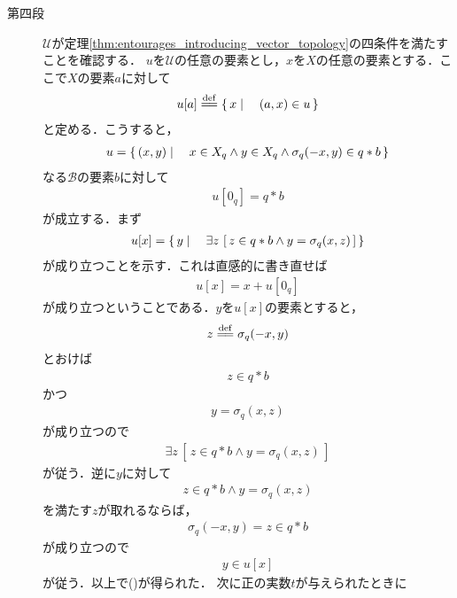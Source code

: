 \begin{sketch}
\begin{description}
			\item[第四段]
				$\mathscr{U}$が定理\ref{thm:entourages_introducing_vector_topology}の四条件を満たすことを確認する．
				$u$を$\mathscr{U}$の任意の要素とし，$x$を$X$の任意の要素とする．ここで$X$の要素$a$に対して
				\begin{align}
					u[a] \defeq \Set{x}{(a,x) \in u}
				\end{align}
				と定める．こうすると，
				\begin{align}
					u = \left\{\, (x,y) \mid \quad x \in X_q \wedge y \in X_q \wedge \sigma_q(-x,y) \in q \ast b\, \right\}
				\end{align}
				なる$\mathscr{B}$の要素$b$に対して
				\begin{align}
					u[0_q] = q \ast b
				\end{align}
				が成立する．まず
				\begin{align}
					u[x] = \left\{\, y \mid \quad \exists z\, \left[\, z \in q \ast b \wedge y = \sigma_q(x,z)\, \right]\, \right\}
					\label{fom:thm_quotient_topological_vector_space_2}
				\end{align}
				が成り立つことを示す．これは直感的に書き直せば
				\begin{align}
					u[x] = x  + u[0_q]
				\end{align}
				が成り立つということである．$y$を$u[x]$の要素とすると，
				\begin{align}
					z \defeq \sigma_q(-x,y)
				\end{align}
				とおけば
				\begin{align}
					z \in q \ast b
				\end{align}
				かつ
				\begin{align}
					y = \sigma_q(x,z)
				\end{align}
				が成り立つので
				\begin{align}
					\exists z\, \left[\, z \in q \ast b \wedge y = \sigma_q(x,z)\, \right]
				\end{align}
				が従う．逆に$y$に対して
				\begin{align}
					z \in q \ast b \wedge y = \sigma_q(x,z)
				\end{align}
				を満たす$z$が取れるならば，
				\begin{align}
					\sigma_q(-x,y) = z \in q \ast b
				\end{align}
				が成り立つので
				\begin{align}
					y \in u[x]
				\end{align}
				が従う．以上で()が得られた．
				次に正の実数$t$が与えられたときに

\end{description}
\end{sketch}
